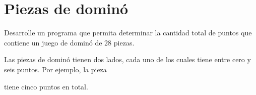 \section{Piezas de dominó}

Desarrolle un programa que permita determinar la cantidad total de
puntos que contiene un juego de dominó de 28 piezas.

Las piezas de dominó tienen dos lados, cada uno de los cuales
tiene entre cero y seis puntos.
Por ejemplo, la pieza

tiene cinco puntos en total.
